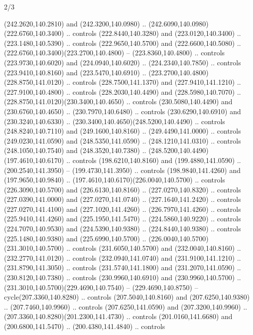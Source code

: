 \begin{flagdescription}{2/3}
\begin{scope}[xshift=0.5\flaglength,yshift=0.5\flagwidth,scale=\flagwidth/259.2]
\begin{scope}[y=0.8pt, x=0.8pt, yscale=-1,shift={(-243,-162)}]
      (242.2620,140.2810) and (242.3200,140.0980) ..
      (242.6090,140.0980)(222.6760,140.3400) .. controls (222.8440,140.3280) and
      (223.0120,140.3400) .. (223.1480,140.5390) .. controls (222.9650,140.5700) and
      (222.6600,140.5080) .. (222.6760,140.3400)(223.2700,140.4800) --
      (223.8360,140.4800) .. controls (223.9730,140.6020) and (224.0940,140.6020) ..
      (224.2340,140.7850) .. controls (223.9410,140.8160) and (223.5470,140.6910) ..
      (223.2700,140.4800)(228.8750,141.0120) .. controls (228.7500,141.1370) and
      (227.9410,141.1210) .. (227.9100,140.4800) .. controls (228.2030,140.4490) and
      (228.5980,140.7070) .. (228.8750,141.0120)(230.3400,140.4650) .. controls
      (230.5080,140.4490) and (230.6760,140.4650) .. (230.7970,140.6480) .. controls
      (230.6290,140.6910) and (230.3240,140.6330) ..
      (230.3400,140.4650)(248.5200,140.4490) .. controls (248.8240,140.7110) and
      (249.1600,140.8160) .. (249.4490,141.0000) .. controls (249.0230,141.0590) and
      (248.5350,141.0590) .. (248.1210,141.0310) .. controls (248.1050,140.7540) and
      (248.3520,140.7380) .. (248.5200,140.4490)(197.4610,140.6170) .. controls
      (198.6210,140.8160) and (199.4880,141.0590) .. (200.2540,141.3950) --
      (199.4730,141.3950) .. controls (198.9840,141.4260) and (197.9650,140.9840) ..
      (197.4610,140.6170)(226.0040,140.5700) .. controls (226.3090,140.5700) and
      (226.6130,140.8160) .. (227.0270,140.8320) .. controls (227.0390,141.0000) and
      (227.0270,141.0740) .. (227.1640,141.2420) .. controls (227.0270,141.4100) and
      (227.1020,141.4260) .. (226.7970,141.4260) .. controls (225.9410,141.4260) and
      (225.1950,141.5470) .. (224.5860,140.9220) .. controls (224.7070,140.9530) and
      (224.5390,140.9380) .. (224.8440,140.9380) .. controls (225.1480,140.9380) and
      (225.6990,140.5700) .. (226.0040,140.5700)(231.3010,140.5700) .. controls
      (231.6050,140.5700) and (232.0040,140.8160) .. (232.2770,141.0120) .. controls
      (232.0940,141.0740) and (231.9100,141.1210) .. (231.8790,141.3050) .. controls
      (231.5740,141.1800) and (231.2070,141.0590) .. (230.8120,140.7380) .. controls
      (230.9960,140.6910) and (230.9960,140.5700) ..
      (231.3010,140.5700)(229.4690,140.7540) -- (229.4690,140.8750) --
      cycle(207.3360,140.8280) .. controls (207.5040,140.8160) and
      (207.6250,140.9380) .. (207.7460,140.9960) .. controls (207.6250,141.0590) and
      (207.3200,140.9960) .. (207.3360,140.8280)(201.2300,141.4730) .. controls
      (201.0160,141.6680) and (200.6800,141.5470) .. (200.4380,141.4840) .. controls

\end{scope}
\end{scope}
\end{flagdescription}
